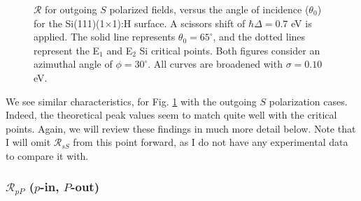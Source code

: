 \begin{figure}[h]
\centering
{}\hfill
{}
\caption{$\mathcal{R}$ for outgoing $S$ polarized fields, versus the angle of
incidence ($\theta_{0}$) for the Si(111)(1$\times$1):H surface. A scissors shift
of $\hbar\Delta = 0.7$ eV is applied. The solid line represents $\theta_{0} =
65^{\circ}$, and the dotted lines represent the E$_{1}$ and E$_{2}$ Si critical
points. Both figures consider an azimuthal angle of $\phi = 30^{\circ}$. All
curves are broadened with $\sigma = 0.10$ eV.}
\label{fig:1x1rS3d}
\end{figure}

We see similar characteristics, for Fig. \ref{fig:1x1rS3d} with the outgoing $S$
polarization cases. Indeed, the theoretical peak values seem to match quite well
with the critical points. Again, we will review these findings in much more
detail below. Note that I will omit $\mathcal{R}_{sS}$ from this point forward,
as I do not have any experimental data to compare it with.



\subsubsection{\texorpdfstring{$\mathcal{R}_{pP}$}{RpP} ($p$-in, $P$-out)}
\label{sec:1x1RpP}

